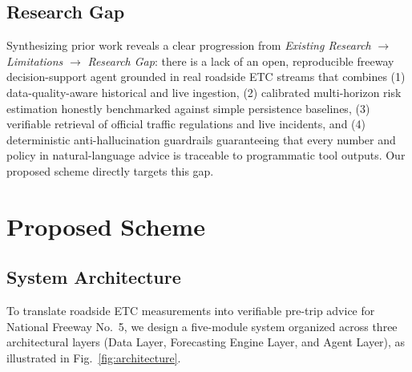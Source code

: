 \documentclass[conference]{IEEEtran}
\begin{document}
\subsection{Research Gap}
Synthesizing prior work reveals a clear progression from \emph{Existing Research} $\rightarrow$ \emph{Limitations} $\rightarrow$ \emph{Research Gap}: there is a lack of an open, reproducible freeway decision-support agent grounded in real roadside ETC streams that combines (1) data-quality-aware historical and live ingestion, (2) calibrated multi-horizon risk estimation honestly benchmarked against simple persistence baselines, (3) verifiable retrieval of official traffic regulations and live incidents, and (4) deterministic anti-hallucination guardrails guaranteeing that every number and policy in natural-language advice is traceable to programmatic tool outputs. Our proposed scheme directly targets this gap.

\section{Proposed Scheme}

\subsection{System Architecture}
To translate roadside ETC measurements into verifiable pre-trip advice for National Freeway No.~5, we design a five-module system organized across three architectural layers (Data Layer, Forecasting Engine Layer, and Agent Layer), as illustrated in Fig.~\ref{fig:architecture}.
\end{document}
